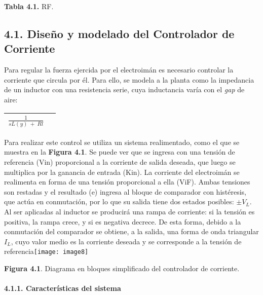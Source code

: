 \documentclass{article} %
\begin{document}
\textbf{Tabla 4.1. }RF.

\noindent 
\subsection{4.1. Dise\~{n}o y modelado del Controlador de Corriente }

\noindent Para regular la fuerza ejercida por el electroim\'{a}n es necesario controlar la corriente que circula por \'{e}l. Para ello, se modela a la planta como la impedancia de un inductor con una resistencia serie, cuya inductancia var\'{i}a con el \textit{gap} de aire: 

\noindent 

\begin{tabular}{|p{3.9in}|p{0.4in}|} \hline 
$\frac{1}{sL(y)\ +\ Rl}$\textbf{} &  \\ \hline 
\end{tabular}



\noindent Para realizar este control se utiliza un sistema realimentado, como el que se muestra en la \textbf{Figura 4.1}. Se puede ver que se ingresa con una tensi\'{o}n de referencia (Vin) proporcional a la corriente de salida deseada, que luego se multiplica por la ganancia de entrada (Kin). La corriente del electroim\'{a}n se realimenta en forma de una tensi\'{o}n proporcional a ella (ViF). Ambas tensiones son restadas y el resultado (e) ingresa al bloque de comparador con hist\'{e}resis, que act\'{u}a en conmutaci\'{o}n, por lo que su salida tiene dos estados posibles: $\pm V_L$. Al ser aplicadas al inductor se producir\'{a} una rampa de corriente: si la tensi\'{o}n es positiva, la rampa crece, y si es negativa decrece. De esta forma, debido a la conmutaci\'{o}n del comparador se obtiene, a la salida, una forma de onda triangular $I_L$, cuyo valor medio es la corriente deseada y se corresponde a la tensi\'{o}n de referencia\texttt{[image: image8]}

\noindent \textbf{Figura 4.1}. Diagrama en bloques simplificado del controlador de corriente.

\noindent 
\paragraph{4.1.1. Caracter\'{i}sticas del sistema}
\end{document}
